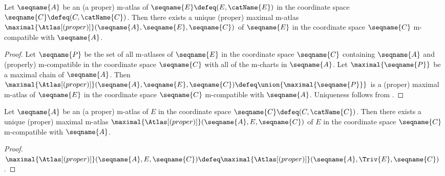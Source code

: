 \documentclass{article}
\begin{document}
\begin{theorem}
\label{the:M-ATLmax}
Let $\seqname{A}$ be an (a proper) m-atlas of
$\seqname{E} \defeq (E, \catName{E})$ in the coordinate space
$\seqname{C} \defeq (C,\catName{C})$. Then there exists a unique
(proper) maximal m-atlas
\nobreaks
  {{
    $\maximal{\Atlas[(proper)]}(\seqname{A}, \seqname{E}, \seqname{C})$
  }}
of $\seqname{E}$ in the coordinate space $\seqname{C}$ m-compatible with
$\seqname{A}$.

\begin{proof}
Let $\seqname{P}$ be the set of all m-atlases of $\seqname{E}$ in the
coordinate space $\seqname{C}$ containing $\seqname{A}$ and (properly)
m-compatible in the coordinate space $\seqname{C}$ with all of the
m-charts in $\seqname{A}$. Let $\maximal{\seqname{P}}$ be a maximal
chain of $\seqname{A}$. Then
\nobreaks
  {{
    $
      \maximal{\Atlas[(proper)]}(\seqname{A}, \seqname{E}, \seqname{C})
      \defeq \union{\maximal{\seqname{P}}}
    $
  }}
is a (proper) maximal m-atlas of $\seqname{E}$ in the coordinate space
$\seqname{C}$ m-compatible with $\seqname{A}$. Uniqueness follows from
.
\end{proof}
\end{theorem}

\begin{corollary}
\label{cor:M-ATLmax}
Let $\seqname{A}$ be an (a proper) m-atlas of $E$
in the coordinate space $\seqname{C} \defeq (C,\catName{C})$. Then there
exists a unique (proper) maximal m-atlas
$\maximal{\Atlas[(proper)]}(\seqname{A}, E, \seqname{C})$ of $E$
in the coordinate space $\seqname{C}$ m-compatible with $\seqname{A}$.

\begin{proof}
$
  \maximal{\Atlas[(proper)]}(\seqname{A}, E, \seqname{C}) \defeq
  \maximal{\Atlas[(proper)]}(\seqname{A}, \Triv{E}, \seqname{C})
$.
\end{proof}
\end{corollary}
\end{document}
